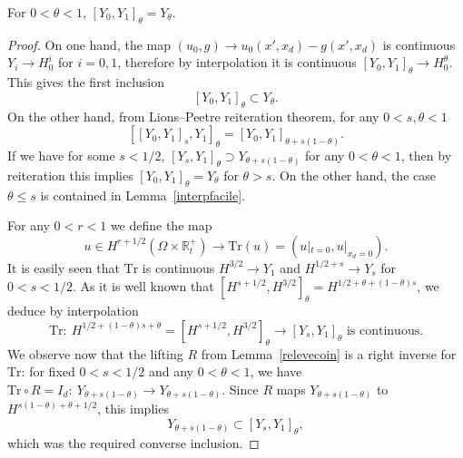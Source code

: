 \documentclass[AHL,Unicode,longabstracts,published]{cedram}
\newcommand{\R}{\mathbb{R}}
\newcommand{\Tr}{\mathrm{Tr}}
\begin{document}
\begin{prop}
For $0<\theta<1$, $[Y_0,Y_1]_\theta=Y_\theta$.
\end{prop}
\begin{proof}
On one hand, the map $(u_0,g)\to u_0(x',x_d)-g(x',x_d)$ is continuous $Y_i\to H^i_0$ for $i=0,1$, therefore by interpolation it is continuous $[Y_0,Y_1]_\theta\to H^\theta_0$. This gives the first inclusion
\begin{equation}\label{inclusion}
[Y_0,Y_1]_\theta\subset Y_\theta.
\end{equation}
On the other hand, from Lions--Peetre reiteration theorem, for any $0<s,\theta<1$
\[
[[Y_0,Y_1]_s,Y_1]_\theta=[Y_0,Y_1]_{\theta+s(1-\theta)}.
\]
If we have for some $s<1/2$, $[Y_s,Y_1]_\theta\supset Y_{\theta+s(1-\theta)}$ for any $0<\theta<1$, then by reiteration this implies $[Y_0,Y_1]_\theta=Y_\theta$ for $\theta >s$. On the other hand, the case $\theta\leq s$ is contained in Lemma~\ref{interpfacile}.

For any $0<r<1$ we define the map
\[
u\in H^{r+1/2}\left(\Omega\times \R_t^+\right)
\to \Tr(u)=\left(u|_{t=0},u|_{x_d=0}\right).
\]
It is easily seen that $\Tr$ is continuous $H^{3/2}\to Y_1$ and $H^{1/2+s}\to Y_s$ for $0<s<1/2$. As it is well known that $[H^{s+1/2},H^{3/2}]_{\theta}=H^{1/2+\theta +(1-\theta)s}$, we deduce by interpolation
\[
\Tr:\ H^{1/2+(1-\theta)s+\theta}=\left[H^{s+1/2},H^{3/2}\right]_\theta\to [Y_s,Y_1]_\theta\text{ is continuous}.
\]
We observe now that the lifting $R$ from Lemma~\ref{relevecoin} is a right inverse for $\Tr$: for fixed $0<s<1/2$ and any $0<\theta<1$, we have $\Tr\circ R=I_d:\ Y_{\theta+s(1-\theta)}
\to Y_{\theta+s(1-\theta)}$. Since $R$ maps $Y_{\theta+s(1-\theta)}$ to $H^{s(1-\theta)+\theta+1/2}$, this implies
\[
Y_{\theta+s(1-\theta)}\subset [Y_s,Y_1]_\theta,
\]
which was the required converse inclusion.
\end{proof}

\end{document}
